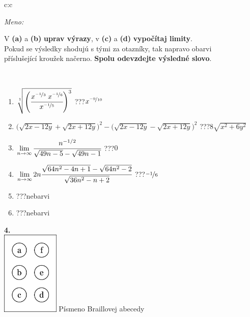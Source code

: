 \documentclass[10pt]{report}
\begin{document}
\begin{tabular}{c:c}
\begin{minipage}[c][104.5mm][t]{0.5\linewidth}
\begin{center}
\textit{Meno:}\phantom{xxxxxxxxxxxxxxxxxxxxxxxxxxxxxxxxxxxxxxxxxxxxxxxxxxxxxxxxxxxxxxxxx}\\[5mm]
\begin{minipage}{0.95\linewidth}
\begin{center}
V \textbf{(a)} a \textbf{(b)} \textbf{uprav výrazy}, v \textbf{(c)} a \textbf{(d)} \textbf{vypočítaj limity}.\\Pokud se výsledky shodujú s tými za otazníky, tak napravo obarvi\\příslušející kroužek načerno. \textbf{Spolu odevzdejte výsledné slovo}.
\end{center}
\end{minipage}
\\[1mm]
\begin{minipage}{0.79\linewidth}
\begin{center}
\begin{varwidth}{\linewidth}
\begin{enumerate}
\small
\item $\sqrt[1]{\left(\cfrac{x^{\nicefrac{-1}{3}}\;x^{\nicefrac{-1}{6}}}{x^{\nicefrac{-1}{5}}}\right)^{3}}$\quad \dotfill\; ???\;\dotfill \quad $x^{\nicefrac{-9}{10}}$
\item {\footnotesize{\scriptsize$\big(\sqrt{2x-12y}+\sqrt{2x+12y}\big)^2-\big(\sqrt{2x-12y}-\sqrt{2x+12y}\big)^2$}\quad \dotfill\; ???\;\dotfill \quad $8\sqrt{x^2+6y^2}$}
\item $\lim\limits_{n\to\infty}\cfrac{n^{-1/2}}{\sqrt{49n-5}-\sqrt{49n-1}}$\quad \dotfill\; ???\;\dotfill \quad $0$
\item $\lim\limits_{n\to\infty}2n\cfrac{\sqrt{64n^2-4n+1}-\sqrt{64n^2-2}}{\sqrt{36n^2-n+2}}$\quad \dotfill\; ???\;\dotfill \quad $\nicefrac{-1}{6}$
\item \quad \dotfill\; ???\;\dotfill \quad nebarvi
\item \quad \dotfill\; ???\;\dotfill \quad nebarvi
\end{enumerate}
\end{varwidth}
\end{center}
\end{minipage}
\begin{minipage}{0.20\linewidth}
\begin{center}
{\Huge\bfseries 4.} \\[2mm]
\includegraphics[height=40mm]{../images/braille.png}
{\small Písmeno Braillovej abecedy}
\end{center}
\end{minipage}
\end{center}
\end{minipage}
%
\end{tabular}
\end{document}
